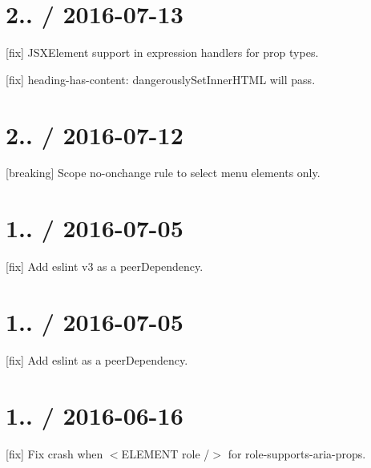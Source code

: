 \section*{2.. / 2016-\/07-\/13 }


\begin{DoxyItemize}
\item \mbox{[}fix\mbox{]} J\+S\+X\+Element support in expression handlers for prop types.
\item \mbox{[}fix\mbox{]} {\ttfamily heading-\/has-\/content}\+: dangerously\+Set\+Inner\+H\+T\+ML will pass.
\end{DoxyItemize}

\section*{2.. / 2016-\/07-\/12 }


\begin{DoxyItemize}
\item \mbox{[}breaking\mbox{]} Scope {\ttfamily no-\/onchange} rule to select menu elements only.
\end{DoxyItemize}

\section*{1.. / 2016-\/07-\/05 }


\begin{DoxyItemize}
\item \mbox{[}fix\mbox{]} Add {\ttfamily eslint} v3 as a {\ttfamily peer\+Dependency}.
\end{DoxyItemize}

\section*{1.. / 2016-\/07-\/05 }


\begin{DoxyItemize}
\item \mbox{[}fix\mbox{]} Add {\ttfamily eslint} as a {\ttfamily peer\+Dependency}.
\end{DoxyItemize}

\section*{1.. / 2016-\/06-\/16 }


\begin{DoxyItemize}
\item \mbox{[}fix\mbox{]} Fix crash when {\ttfamily $<$E\+L\+E\+M\+E\+NT role /$>$} for {\ttfamily role-\/supports-\/aria-\/props}.
\end{DoxyItemize}

